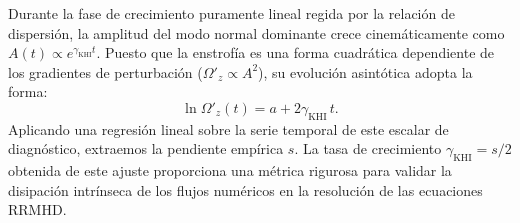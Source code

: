 Durante la fase de crecimiento puramente lineal regida por la relación de dispersión, la amplitud del modo normal dominante crece cinemáticamente como $A(t) \propto e^{\gamma_{\text{KHI}}t}$. Puesto que la enstrofía es una forma cuadrática dependiente de los gradientes de perturbación ($\Omega'_z \propto A^2$), su evolución asintótica adopta la forma:
\begin{equation}
    \ln \Omega'_z(t) = a + 2\gamma_{\text{KHI}}\,t.
\end{equation}
Aplicando una regresión lineal sobre la serie temporal de este escalar de diagnóstico, extraemos la pendiente empírica $s$. La tasa de crecimiento $\gamma_{\text{KHI}} = s/2$ obtenida de este ajuste proporciona una métrica rigurosa para validar la disipación intrínseca de los flujos numéricos en la resolución de las ecuaciones RRMHD.
